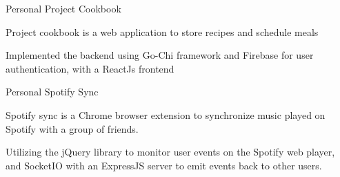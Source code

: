

\begin{cventries}

\cventry
    {Personal}
    {Project Cookbook}
    {}
    {}
    {
     \begin{cvitems} %
        \item {Project cookbook is a web application to store recipes and schedule meals}
        \item {Implemented the backend using Go-Chi framework and Firebase for user authentication, with a ReactJs frontend}
      \end{cvitems}
    }


\cventry
    {Personal}
    {Spotify Sync}
    {}
    {}
    {
     \begin{cvitems} %
        \item {Spotify sync is a Chrome browser extension to synchronize music played on Spotify with a group of friends.}
        \item {Utilizing the jQuery library to monitor user events on the Spotify web player, and SocketIO with an ExpressJS server to emit events back to other users.}
      \end{cvitems}
    }
    
    

\end{cventries}
